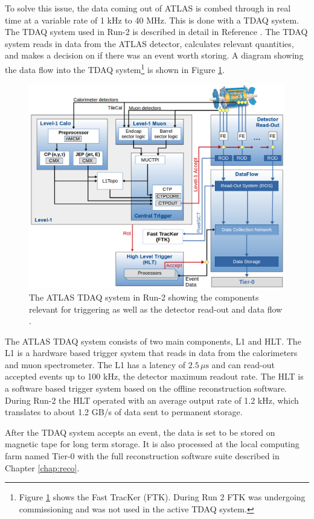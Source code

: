 		To solve this issue, the data coming out of \gls{ATLAS} is combed through in real time at a variable rate of 1 kHz to 40 MHz. This is done with a \gls{TDAQ} system. The \gls{TDAQ} system used in Run-2 is described in detail in Reference \cite{ATLAS-trigger-Run2}. The \gls{TDAQ} system reads in data from the \gls{ATLAS} detector, calculates relevant quantities, and makes a decision on if there was an event worth storing. A diagram showing the data flow into the \gls{TDAQ} system\footnote{Figure \ref{fig:trigger-run2} shows the Fast TracKer (FTK). During Run 2 FTK was undergoing commissioning and was not used in the active \gls{TDAQ} system.} is shown in Figure \ref{fig:trigger-run2}.
		\begin{figure}[!ht]
		\centering
		\includegraphics[width=\textwidth,keepaspectratio=true]{chapters/chapter3_experiment/images/tdaq-run2-schematic2017.png}
		\caption{The \gls{ATLAS} \gls{TDAQ} system in Run-2 showing the components relevant for triggering as well as the detector read-out and data flow \cite{TDAQ_Diagram}.}
		\label{fig:trigger-run2}
		\end{figure}
		The \gls{ATLAS} \gls{TDAQ} system consists of two main components, \gls{L1} and \gls{HLT}. The \gls{L1} is a hardware based trigger system that reads in data from the calorimeters and muon spectrometer. The \gls{L1} has a latency of $2.5 \, \mu \mathrm{s}$ and can read-out accepted events up to 100 kHz, the detector maximum readout rate. The \gls{HLT} is a software based trigger system based on the offline reconstruction software. During Run-2 the \gls{HLT} operated with an average output rate of 1.2 kHz, which translates to about 1.2 GB/s of data sent to permanent storage.	

		After the \gls{TDAQ} system accepts an event, the data is set to be stored on magnetic tape for long term storage. It is also processed at the local computing farm named Tier-0 with the full reconstruction software suite described in Chapter \ref{chap:reco}.

